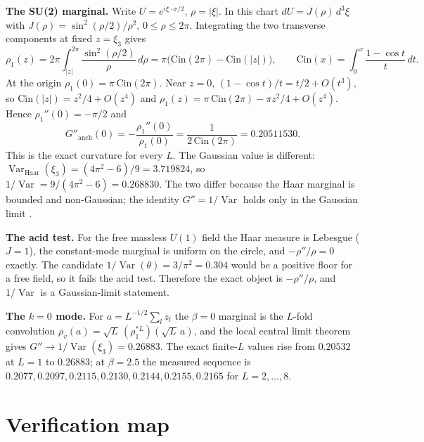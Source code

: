 \documentclass[11pt,a4paper]{article}
\newcommand{\labb}[2]{\fcolorbox{#1!35}{#1!8}{\textcolor{#1}{\textbf{\scriptsize #2}}}}
\newcommand{\LC}{\labb{cC}{C}}
\begin{document}
\textbf{The SU(2) marginal.} Write $U=e^{i\xi\cdot\sigma/2}$, $\rho=|\xi|$. In this chart
$dU=J(\rho)\,d^3\xi$ with $J(\rho)=\sin^2(\rho/2)/\rho^2$, $0\le\rho\le2\pi$. Integrating the two
transverse components at fixed $z=\xi_3$ gives
\[
  \rho_1(z)=2\pi\int_{|z|}^{2\pi}\frac{\sin^2(\rho/2)}{\rho}\,d\rho
          =\pi\bigl(\mathrm{Cin}(2\pi)-\mathrm{Cin}(|z|)\bigr),
  \qquad
  \mathrm{Cin}(x)=\int_0^x\frac{1-\cos t}{t}\,dt .
\]
At the origin $\rho_1(0)=\pi\,\mathrm{Cin}(2\pi)$. Near $z=0$,
$(1-\cos t)/t=t/2+O(t^3)$, so $\mathrm{Cin}(|z|)=z^2/4+O(z^4)$ and
$\rho_1(z)=\pi\,\mathrm{Cin}(2\pi)-\pi z^2/4+O(z^4)$. Hence $\rho_1''(0)=-\pi/2$ and
\begin{equation}
  G''_{\mathrm{anch}}(0)=-\frac{\rho_1''(0)}{\rho_1(0)}
  =\frac{1}{2\,\mathrm{Cin}(2\pi)}=0.20511530 .
  \label{eq:anchorproof}
\end{equation}
This is the exact curvature for every $L$. The Gaussian value is different:
$\operatorname{Var}_{\mathrm{Haar}}(\xi_3)=(4\pi^2-6)/9=3.719824$, so
$1/\operatorname{Var}=9/(4\pi^2-6)=0.268830$. The two differ because the Haar marginal is bounded
and non-Gaussian; the identity $G''=1/\operatorname{Var}$ holds only in the Gaussian limit
\LC.

\textbf{The acid test.} For the free massless $U(1)$ field the Haar measure is Lebesgue
($J=1$), the constant-mode marginal is uniform on the circle, and $-\rho''/\rho=0$ exactly. The
candidate $1/\operatorname{Var}(\theta)=3/\pi^2=0.304$ would be a positive floor for a free field,
so it fails the acid test. Therefore the exact object is $-\rho''/\rho$, and $1/\operatorname{Var}$
is a Gaussian-limit statement.

\textbf{The $k=0$ mode.} For $a=L^{-1/2}\sum_l z_l$ the $\beta=0$ marginal is the $L$-fold
convolution $\rho_v(a)=\sqrt L\,(\rho_1^{*L})(\sqrt L\,a)$, and the local central limit theorem
gives $G''\to1/\operatorname{Var}(\xi_3)=0.26883$. The exact finite-$L$ values rise from
$0.20532$ at $L=1$ to $0.26883$; at $\beta=2.5$ the measured sequence is
$0.2077,0.2097,0.2115,0.2130,0.2144,0.2155,0.2165$ for $L=2,\dots,8$.

\section{Verification map}
\label{app:verif}
\end{document}
